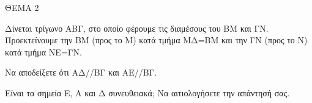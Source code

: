 
ΘΕΜΑ 2

Δίνεται τρίγωνο ΑΒΓ, στο οποίο φέρουμε τις διαμέσους του ΒΜ και ΓΝ. Προεκτείνουμε την ΒΜ (προς το Μ) κατά τμήμα ΜΔ=ΒΜ και την ΓΝ (προς το Ν) κατά τμήμα ΝΕ=ΓΝ.

\begin{alist}
\item Να αποδείξετε ότι ΑΔ//ΒΓ και ΑΕ//ΒΓ. 

\item Είναι τα σημεία Ε, Α και Δ συνευθειακά; Να αιτιολογήσετε την απάντησή σας.

\end{alist}
